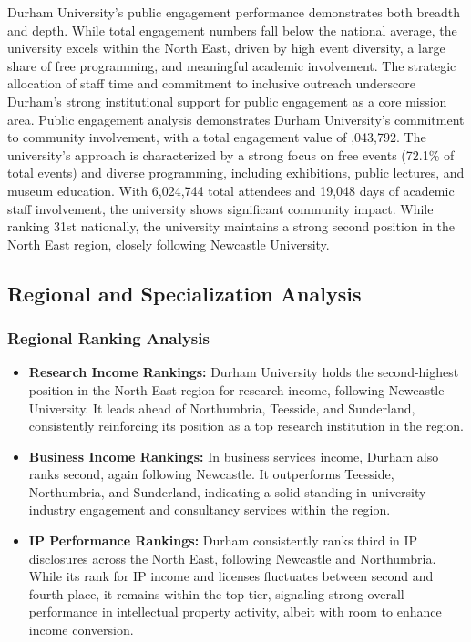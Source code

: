 \documentclass[journal,onecolumn, 10pt,draftclsnofoot]{IEEEtran}
\begin{document}
Durham University's public engagement performance demonstrates both breadth and depth. While total engagement numbers fall below the national average, the university excels within the North East, driven by high event diversity, a large share of free programming, and meaningful academic involvement. The strategic allocation of staff time and commitment to inclusive outreach underscore Durham's strong institutional support for public engagement as a core mission area. Public engagement analysis demonstrates Durham University's commitment to community involvement, with a total engagement value of ,043,792. The university's approach is characterized by a strong focus on free events (72.1\% of total events) and diverse programming, including exhibitions, public lectures, and museum education. With 6,024,744 total attendees and 19,048 days of academic staff involvement, the university shows significant community impact. While ranking 31st nationally, the university maintains a strong second position in the North East region, closely following Newcastle University.

\subsection{Regional and Specialization Analysis}
\label{sec:regional-analysis}

\subsubsection{Regional Ranking Analysis}

\begin{itemize}
    \item \textbf{Research Income Rankings:} Durham University holds the second-highest position in the North East region for research income, following Newcastle University. It leads ahead of Northumbria, Teesside, and Sunderland, consistently reinforcing its position as a top research institution in the region.
    
    \item \textbf{Business Income Rankings:} In business services income, Durham also ranks second, again following Newcastle. It outperforms Teesside, Northumbria, and Sunderland, indicating a solid standing in university-industry engagement and consultancy services within the region.
    
    \item \textbf{IP Performance Rankings:} Durham consistently ranks third in IP disclosures across the North East, following Newcastle and Northumbria. While its rank for IP income and licenses fluctuates between second and fourth place, it remains within the top tier, signaling strong overall performance in intellectual property activity, albeit with room to enhance income conversion.
\end{itemize}
\end{document}

